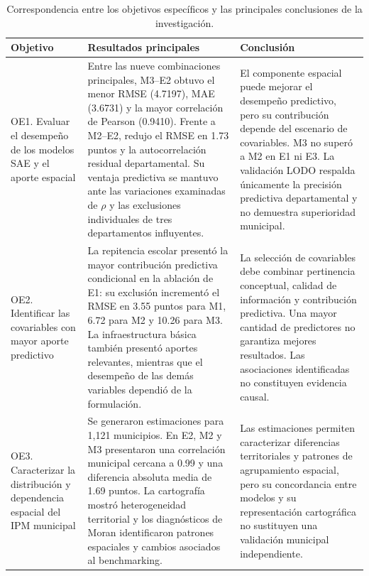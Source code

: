 \begin{table}[!htbp]
\centering
\footnotesize
\caption{Correspondencia entre los objetivos específicos y las principales conclusiones de la investigación.}
\label{tab:conclusiones-objetivos}
\renewcommand{\arraystretch}{1.15}
\setlength{\tabcolsep}{4pt}

\begin{tabular}{p{1.3cm} p{5.6cm} p{5.2cm}}
\hline
Objetivo & Resultados principales & Conclusión \\
\hline

OE1. Evaluar el desempeño de los modelos SAE y el aporte espacial &
Entre las nueve combinaciones principales, M3--E2 obtuvo el menor RMSE (4.7197), MAE (3.6731) y la mayor correlación de Pearson (0.9410). Frente a M2--E2, redujo el RMSE en 1.73 puntos y la autocorrelación residual departamental. Su ventaja predictiva se mantuvo ante las variaciones examinadas de $\rho$ y las exclusiones individuales de tres departamentos influyentes. &
El componente espacial puede mejorar el desempeño predictivo, pero su contribución depende del escenario de covariables. M3 no superó a M2 en E1 ni E3. La validación LODO respalda únicamente la precisión predictiva departamental y no demuestra superioridad municipal. \\

\hline

OE2. Identificar las covariables con mayor aporte predictivo &
La repitencia escolar presentó la mayor contribución predictiva condicional en la ablación de E1: su exclusión incrementó el RMSE en 3.55 puntos para M1, 6.72 para M2 y 10.26 para M3. La infraestructura básica también presentó aportes relevantes, mientras que el desempeño de las demás variables dependió de la formulación. &
La selección de covariables debe combinar pertinencia conceptual, calidad de información y contribución predictiva. Una mayor cantidad de predictores no garantiza mejores resultados. Las asociaciones identificadas no constituyen evidencia causal. \\

\hline

OE3. Caracterizar la distribución y dependencia espacial del IPM municipal &
Se generaron estimaciones para 1{,}121 municipios. En E2, M2 y M3 presentaron una correlación municipal cercana a 0.99 y una diferencia absoluta media de 1.69 puntos. La cartografía mostró heterogeneidad territorial y los diagnósticos de Moran identificaron patrones espaciales y cambios asociados al benchmarking. &
Las estimaciones permiten caracterizar diferencias territoriales y patrones de agrupamiento espacial, pero su concordancia entre modelos y su representación cartográfica no sustituyen una validación municipal independiente. \\

\hline
\end{tabular}
\end{table}

